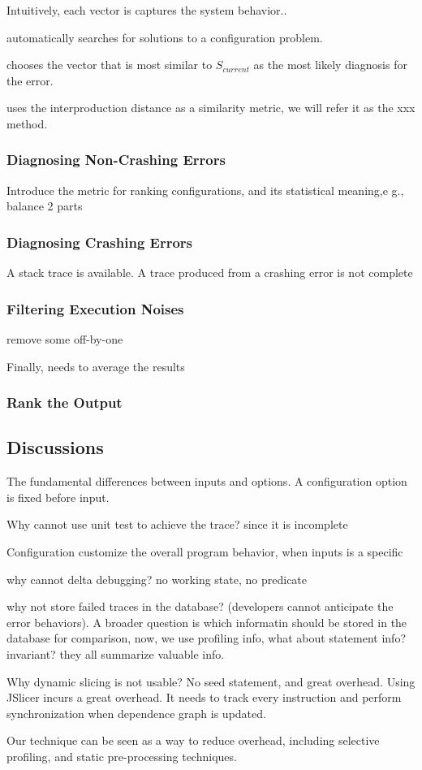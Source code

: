 Intuitively, each vector is captures the system behavior..

\ourtool automatically searches for solutions to a configuration
problem.

\ourtool chooses the vector that is most similar to $S_{current}$ as
the most likely diagnosis for the error.

\ourtool uses the interproduction distance as a similarity metric, we will
refer it as the xxx method.


\subsubsection{Diagnosing Non-Crashing Errors}

Introduce the metric for ranking configurations, and its
statistical meaning,e g., balance 2 parts

\subsubsection{Diagnosing Crashing Errors}

A stack trace is available. A trace produced from a crashing error is not complete

\subsubsection{Filtering Execution Noises}

remove some off-by-one


Finally, needs to average the results
\subsubsection{Rank the Output}

\subsection{Discussions}

The fundamental differences between inputs and options. A configuration
option is fixed before input.

Why cannot use unit test to achieve the trace? since it is incomplete

Configuration customize the overall program behavior, when inputs is a specific

why cannot delta debugging? no working state, no predicate

why not store failed traces in the database? (developers
cannot anticipate the error behaviors). A broader question is which
informatin should be stored in the database for comparison, now, we use
profiling info, what about statement info? invariant? they all
summarize valuable info.

Why dynamic slicing is not usable? No seed statement, and great overhead. Using JSlicer incurs
a great overhead. It needs to track every instruction and
perform synchronization when dependence graph is updated.

Our technique can be seen as a way to reduce overhead,
including selective profiling, and static pre-processing
techniques.

